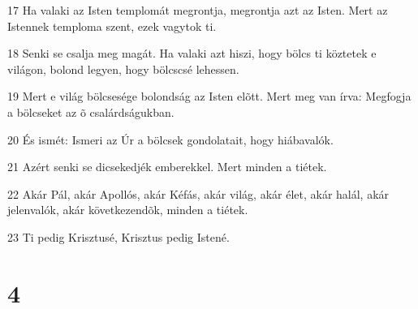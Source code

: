 \par 17 Ha valaki az Isten templomát megrontja, megrontja azt az Isten. Mert az Istennek temploma szent, ezek vagytok ti.
\par 18 Senki se csalja meg magát. Ha valaki azt hiszi, hogy bölcs ti köztetek e világon, bolond legyen, hogy bölcscsé lehessen.
\par 19 Mert e világ bölcsesége bolondság az Isten elõtt. Mert meg van írva: Megfogja a bölcseket az õ csalárdságukban.
\par 20 És ismét: Ismeri az Úr a bölcsek gondolatait, hogy hiábavalók.
\par 21 Azért senki se dicsekedjék emberekkel. Mert minden a tiétek.
\par 22 Akár Pál, akár Apollós, akár Kéfás, akár világ, akár élet, akár halál, akár jelenvalók, akár következendõk, minden a tiétek.
\par 23 Ti pedig Krisztusé, Krisztus pedig Istené.

\chapter{4}


